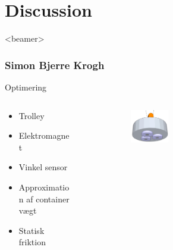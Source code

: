 \section{Discussion}
\begin{frame}<beamer>
\frametitle{Simon Bjerre Krogh}
\tableofcontents[currentsection]
\end{frame}


\begin{frame}{Optimering}{}

\begin{columns}[T]
\begin{column}{.35\textwidth}

  \begin{itemize}
    \item<1-> Trolley
    \vspace{0.8cm}
    \item<2-> Elektromagnet  
    \vspace{1.5cm}
    \item<3-> Vinkel sensor
    \vspace{1cm}
    \item<4-> Approximation af container vægt 
    \vspace{0.5cm}
    \item<5-> Statisk friktion
  \end{itemize}
\end{column}%
\hfill%
\begin{column}{.65\textwidth}

\begin{figure}[H]
  \centering
{}  \begin{subfigure}{0.98\textwidth}
        \centering
        \includegraphics[width=0.3\textwidth]{Billeder/Electromagnet.png}
        \end{subfigure}



\end{figure}
\end{column}
\end{columns}
\end{frame}
